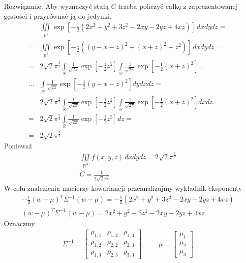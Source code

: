 Rozwiązanie:
Aby wyznaczyć stałą $ C $ trzeba policzyć całkę z zaprezentowanej gęstości i przyrównać ją do jedynki.
\begin{align*}
&\iiint\limits_{\mathbb R ^3}\exp\left[-\frac{1}{2}\left(2x^2+y^2+3z^2-2xy-2yz+4xz\right)\right]\,dxdydz
=\\=&
\iiint\limits_{\mathbb R ^3}\exp\left[-\frac{1}{2}\left((y-x-z)^2+(x+z)^2+z^2\right)\right]\,dxdydz
=\\=&
2\sqrt 2\pi^\frac{3}{2}\int\limits_{\mathbb R }\frac{1}{\sqrt{2\pi}}\exp\left[-\frac{1}{2}z^2\right]
\int\limits_{\mathbb R }\frac{1}{\sqrt{2\pi}}\exp\left[-\frac{1}{2}\left(x+z\right)^2\right]\dots\\\dots&
\int\limits_{\mathbb R }\frac{1}{\sqrt{2\pi}}\exp\left[-\frac{1}{2}\left(y-x-z\right)^2\right]dydxdz
=\\=&
2\sqrt 2\pi^\frac{3}{2}\int\limits_{\mathbb R }\frac{1}{\sqrt{2\pi}}\exp\left[-\frac{1}{2}z^2\right]
\int\limits_{\mathbb R }\frac{1}{\sqrt{2\pi}}\exp\left[-\frac{1}{2}\left(x+z\right)^2\right]dxdz
=\\=&
2\sqrt 2\pi^\frac{3}{2}\int\limits_{\mathbb R }\frac{1}{\sqrt{2\pi}}\exp\left[-\frac{1}{2}z^2\right]dz
=\\=&
2\sqrt 2\pi^\frac{3}{2}
\end{align*}
Ponieważ
\begin{gather*}
\iiint\limits_{\mathbb R ^3}f(x,y,z)\,dxdydz=
2\sqrt 2\pi^\frac{3}{2}\\
C=\frac{1}{2\sqrt 2\pi^\frac{3}{2}}
\end{gather*}
W celu znalezienia macierzy kowariancji przeanalizujmy wykładnik eksponenty
\begin{gather*}
-\frac{1}{2}(w-\mu)^T\Sigma^{-1}(w-\mu)=
-\frac{1}{2}\left(2x^2+y^2+3z^2-2xy-2yz+4xz\right)\\
(w-\mu)^T\Sigma^{-1}(w-\mu)=
2x^2+y^2+3z^2-2xy-2yz+4xz
\end{gather*}
Oznaczmy
\begin{gather*}
\Sigma^{-1}=
\begin{bmatrix}
	\rho _{1,1} & \rho _{1,2} & \rho _{1,3} \\
	\rho _{1,2} & \rho _{2,2} & \rho _{2,3} \\
	\rho _{1,3} & \rho _{2,3} & \rho _{3,3}
\end{bmatrix},\qquad
\mu=\begin{bmatrix}
\mu_1\\
\mu_2\\
\mu_3
\end{bmatrix}
\end{gather*}
